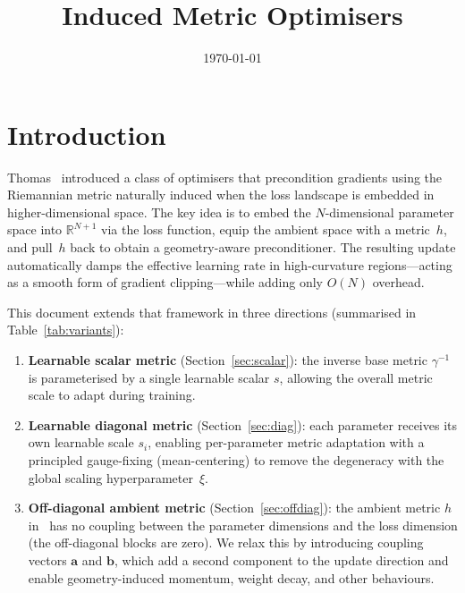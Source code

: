 \documentclass{article}
\title{Induced Metric Optimisers}
\date{\today}
\newcommand{\vecb}[1]{\boldsymbol{#1}}
\begin{document}
\maketitle
\tableofcontents
\newpage


\section{Introduction}\label{sec:intro}

Thomas~\cite{harvey2025} introduced a class of optimisers that precondition gradients
using the Riemannian metric naturally induced when the loss landscape is embedded in
higher-dimensional space.
The key idea is to embed the $N$-dimensional parameter space into $\mathbb{R}^{N+1}$
via the loss function, equip the ambient space with a metric~$h$, and pull~$h$ back to
obtain a geometry-aware preconditioner.
The resulting update automatically damps the effective learning rate in high-curvature
regions---acting as a smooth form of gradient clipping---while adding only $O(N)$ overhead.

This document extends that framework in three directions
(summarised in Table~\ref{tab:variants}):

\begin{enumerate}[label=(\roman*)]
    \item \textbf{Learnable scalar metric} (Section~\ref{sec:scalar}):
    the inverse base metric $\gamma^{-1}$ is parameterised by a single learnable scalar $s$,
    allowing the overall metric scale to adapt during training.

    \item \textbf{Learnable diagonal metric} (Section~\ref{sec:diag}):
    each parameter receives its own learnable scale $s_i$,
    enabling per-parameter metric adaptation with a principled
    gauge-fixing (mean-centering) to remove the degeneracy with the global
    scaling hyperparameter~$\xi$.

    \item \textbf{Off-diagonal ambient metric} (Section~\ref{sec:offdiag}):
    the ambient metric $h$ in~\cite{harvey2025} has no coupling between
    the parameter dimensions and the loss dimension (the off-diagonal blocks are zero).
    We relax this by introducing coupling vectors $\vecb{a}$ and $\vecb{b}$,
    which add a second component to the update direction
    and enable geometry-induced momentum, weight decay, and other behaviours.
\end{enumerate}
\end{document}
